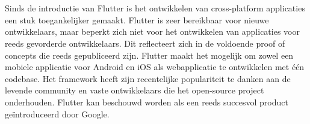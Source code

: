 
\chapter{}
\label{ch:inleiding}

Sinds de introductie van Flutter is het ontwikkelen van cross-platform applicaties een stuk toegankelijker gemaakt. Flutter is zeer bereikbaar voor nieuwe ontwikkelaars, maar beperkt zich niet voor het ontwikkelen van applicaties voor reeds gevorderde ontwikkelaars. Dit reflecteert zich in de voldoende proof of concepts die reeds gepubliceerd zijn. Flutter maakt het mogelijk om zowel een mobiele applicatie voor Android en iOS als webapplicatie te ontwikkelen met één codebase. Het framework heeft zijn recentelijke populariteit te danken aan de levende community en vaste ontwikkelaars die het open-source project onderhouden. Flutter kan beschouwd worden als een reeds succesvol product geïntroduceerd door Google.
\newline



\section{}
\label{sec:probleemstelling}

